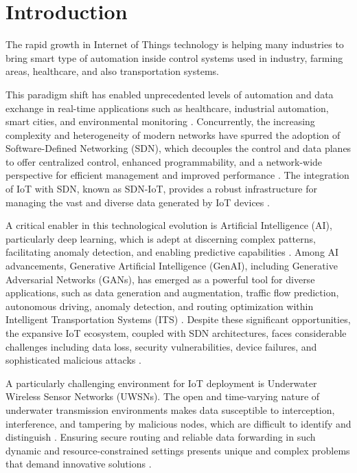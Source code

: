 \documentclass[a4paper,fleqn]{cas-dc}
\numberwithin{equation}{section}
\begin{document}
\section{Introduction}
\label{sec:1}

The rapid growth in Internet of Things technology is helping many industries to bring smart type of automation inside control systems used in industry, farming areas, healthcare, and also transportation systems. 

This paradigm shift has enabled unprecedented levels of automation and data exchange in real-time applications such as healthcare, industrial automation, smart cities, and environmental monitoring \cite{Saadouni20248655}. Concurrently, the increasing complexity and heterogeneity of modern networks have spurred the adoption of Software-Defined Networking (SDN), which decouples the control and data planes to offer centralized control, enhanced programmability, and a network-wide perspective for efficient management and improved performance \cite{OspinaCifuentes2024}. The integration of IoT with SDN, known as SDN-IoT, provides a robust infrastructure for managing the vast and diverse data generated by IoT devices \cite{Zabeehullah2025}.

A critical enabler in this technological evolution is Artificial Intelligence (AI), particularly deep learning, which is adept at discerning complex patterns, facilitating anomaly detection, and enabling predictive capabilities \cite{Lin20231781}. Among AI advancements, Generative Artificial Intelligence (GenAI), including Generative Adversarial Networks (GANs), has emerged as a powerful tool for diverse applications, such as data generation and augmentation, traffic flow prediction, autonomous driving, anomaly detection, and routing optimization within Intelligent Transportation Systems (ITS) \cite{Rong2025}. Despite these significant opportunities, the expansive IoT ecosystem, coupled with SDN architectures, faces considerable challenges including data loss, security vulnerabilities, device failures, and sophisticated malicious attacks \cite{Yan2025}.

A particularly challenging environment for IoT deployment is Underwater Wireless Sensor Networks (UWSNs). The open and time-varying nature of underwater transmission environments makes data susceptible to interception, interference, and tampering by malicious nodes, which are difficult to identify and distinguish \cite{wang2024gtr}. Ensuring secure routing and reliable data forwarding in such dynamic and resource-constrained settings presents unique and complex problems that demand innovative solutions \cite{Fu2024}.
\end{document}
